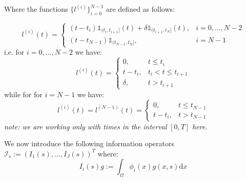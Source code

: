\documentclass{article}
\theoremstyle{definition}
\theoremstyle{remark}
\theoremstyle{remark}
\begin{document}
\noindent Where the functions $\{l^{(i)}\}_{i=0}^{N-1}$ are defined as follows:

\begin{equation}
  l^{(i)}(t) = \left\{\begin{array}{cc}
    (t-t_{i})\mathbb{1}_{(t_{i},t_{i+1}]}(t)+\delta\mathbb{1}_{(t_{i+1},t_{N}]}(t), & i=0,\dots,N-2 \\
    (t-t_{N-1})\mathbb{1}_{(t_{N-1},t_{N}]}, & i=N-1
  \end{array}\right.
\end{equation}
i.e. for $i=0,\dots,N-2$ we have:
\begin{equation}
  l^{(i)}(t) = \left\{\begin{array}{cc}
                        0, & t\leq t_{i} \\
                        t-t_{i}, & t_{i} < t \leq t_{i+1} \\
                        \delta, & t > t_{i+1}
                     \end{array}\right.
\end{equation}
while for for $i=N-1$ we have:
\begin{equation}
  l^{(i)}(t) = l^{(N-1)}(t) =  \left\{\begin{array}{cc}
                        0, & t\leq t_{N-1} \\
                        t-t_{i}, & t > t_{N-1}
                     \end{array}\right.
\end{equation}
\textit{note: we are working only with times in the interval} $[0,T]$ \textit{here.}

\noindent We now introduce the following information operators $\mathcal{I}_{s}:=(I_{1}(s),\dots,I_{J}(s))^{T}$ where:
\begin{equation}
    I_{i}(s)g:=\int_{\Omega}\phi_{i}(x)g(x,s)\mathrm{d}x
\end{equation}
\end{document}
